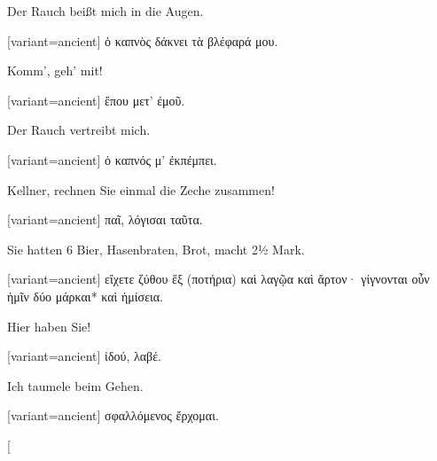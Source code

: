Der Rauch beißt mich in die Augen.

\switchcolumn

\begin{greek}[variant=ancient]%
ὁ καπνὸς δάκνει τὰ βλέφαρά μου.

\end{greek}%
\switchcolumn*

Komm', geh' mit!

\switchcolumn

\begin{greek}[variant=ancient]%
ἕπου μετ' ἐμοῦ.

\end{greek}%
\switchcolumn*

Der Rauch vertreibt mich.

\switchcolumn

\begin{greek}[variant=ancient]%
ὁ καπνός μ' ἐκπέμπει.

\end{greek}%
\switchcolumn*

Kellner, rechnen Sie einmal die Zeche zusammen!

\switchcolumn

\begin{greek}[variant=ancient]%
παῖ, λόγισαι ταῦτα.

\end{greek}%
\switchcolumn*

Sie hatten 6 Bier, Hasenbraten, Brot, macht 2½ Mark.

\switchcolumn

\begin{greek}[variant=ancient]%
εἴχετε ζύθου ἕξ (ποτήρια) καὶ λαγῷα καὶ ἄρτον· γίγνονται οὖν ἡμῖν
δύο μάρκαι{*} καὶ ἡμίσεια.

\end{greek}%
\switchcolumn*

Hier haben Sie!

\switchcolumn

\begin{greek}[variant=ancient]%
ἰδού, λαβέ.

\end{greek}%
\switchcolumn*

Ich taumele beim Gehen.

\switchcolumn

\begin{greek}[variant=ancient]%
σφαλλόμενος ἔρχομαι.

\end{greek}%
\switchcolumn*[


